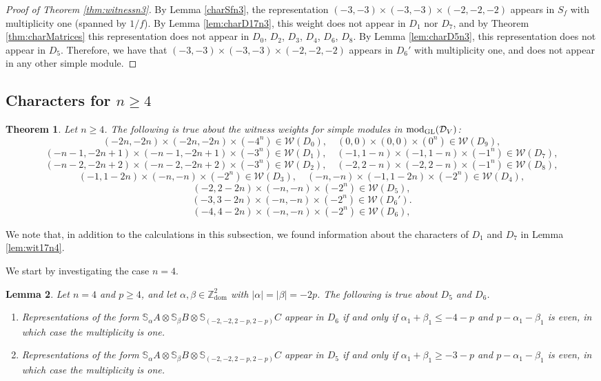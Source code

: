 \documentclass[11pt,reqno]{amsart}
\newcommand{\D}{\mathcal{D}}
\newcommand{\oo}{\otimes}
\newcommand{\bS}{\mathbb{S}}
\newcommand{\tn}{\textnormal}
\newcommand{\GL}{\operatorname{GL}}
\newcommand{\dom}{\operatorname{dom}}
\newcommand{\W}{\mathcal{W}}
\newtheorem{theorem}{Theorem}[section]
\newtheorem{lemma}[theorem]{Lemma}
\numberwithin{equation}{section}
\begin{document}
\begin{proof}[Proof of Theorem \ref{thm:witnessn3}]
By Lemma \ref{charSfn3}, the representation $(-3,-3)\times (-3,-3)\times (-2,-2,-2)$ appears in $S_f$ with multiplicity one (spanned by $1/f$). By Lemma \ref{lem:charD17n3}, this weight does not appear in $D_1$ nor $D_7$, and by Theorem \ref{thm:charMatrices} this representation does not appear in $D_0$, $D_2$, $D_3$, $D_4$, $D_6$, $D_8$. By Lemma \ref{lem:charD5n3}, this representation does not appear in $D_5$. Therefore, we have that $(-3,-3)\times (-3,-3)\times (-2,-2,-2)$ appears in $D_6'$ with multiplicity one, and does not appear in any other simple module.
\end{proof}

\subsection{Characters for $n\geq 4$}\label{sec:charactersn4}

\begin{theorem}\label{thm:witnessngeq4}
Let $n\geq 4$. The following is true about the witness weights for simple modules in $\tn{mod}_{\GL}(\D_V)$:
$$
(-2n,-2n)\times (-2n,-2n)\times (-4^n)\in \W(D_0),\quad (0,0)\times (0,0)\times (0^n)\in \W(D_9),
$$	
$$
(-n-1,-2n+1)\times (-n-1,-2n+1)\times (-3^n)\in \W(D_1),\quad (-1,1-n)\times (-1,1-n)\times (-1^n)\in \W(D_7),
$$
$$
(-n-2,-2n+2)\times (-n-2,-2n+2)\times (-3^n)\in \W(D_2),\quad (-2,2-n)\times (-2,2-n)\times (-1^n)\in \W(D_8),
$$
$$
(-1,1-2n)\times (-n,-n)\times (-2^n)\in \W(D_3),\quad (-n,-n)\times (-1,1-2n)\times (-2^n)\in \W(D_4),
$$
$$
(-2,2-2n)\times (-n,-n) \times (-2^n)\in \W(D_5),
$$
$$
(-3,3-2n)\times (-n,-n)\times (-2^n)\in \W(D_6').
$$
$$
(-4,4-2n)\times (-n,-n)\times (-2^n)\in \W(D_6),
$$
\end{theorem}

We note that, in addition to the calculations in this subsection, we found information about the characters of $D_1$ and $D_7$ in Lemma \ref{lem:wit17n4}.

We start by investigating the case $n=4$.

\begin{lemma}\label{lem:charD5D6ngeq4}
Let $n=4$ and $p\geq 4$, and let $\alpha,\beta \in \mathbb{Z}^2_{\dom}$ with $|\alpha|=|\beta|=-2p$. The following is true about $D_5$ and $D_6$.
\begin{enumerate}
\item Representations of the form $\bS_{\alpha}A\oo \bS_{\beta}B\oo \bS_{(-2,-2,2-p,2-p)}C$	appear in $D_6$ if and only if $\alpha_1+\beta_1\leq -4-p$ and $p-\alpha_1-\beta_1$ is even, in which case the multiplicity is one.
\item Representations of the form $\bS_{\alpha}A\oo \bS_{\beta}B\oo \bS_{(-2,-2,2-p,2-p)}C$	appear in $D_5$ if and only if $\alpha_1+\beta_1\geq -3-p$ and $p-\alpha_1-\beta_1$ is even, in which case the multiplicity is one.
\end{enumerate}
\end{lemma}
\end{document}
